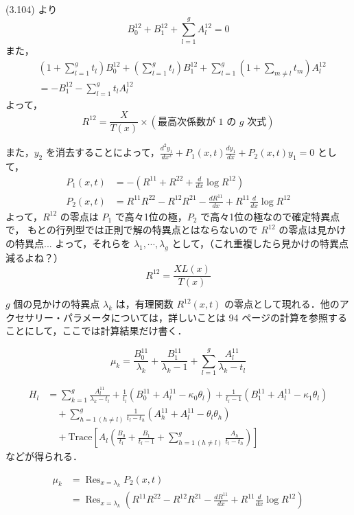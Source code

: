 \documentclass[paper=a4, fontsize=11pt]{jlreq} %
\newenvironment{story}{%
  \begin{mdframed}[
    backgroundcolor=red!5, %
    linewidth=0pt,         %
    innertopmargin=10pt,   %
    innerbottommargin=10pt,
    innerrightmargin=10pt, %
    innerleftmargin=10pt
  ]%
}{%
  \end{mdframed}%
}
\theoremstyle{break}
\theoremstyle{qa}
\begin{document}
(3.104) より
\[
B_0^{12} + B_1^{12} + \sum_{l=1}^g A_l^{12} = 0
\]
また，
\begin{align*}
    &\left( 1 + \sum_{l=1}^g t_l \right) B_0^{12} + \left( \sum_{l=1}^g t_l \right) B_1^{12} + \sum_{l=1}^g \left( 1 + \sum_{m \neq l} t_m \right) A_l^{12} \\
    &= - B_1^{12} - \sum_{l=1}^g t_l A_l^{12}
\end{align*}
よって，
\[
R^{12} = \frac{X}{T(x)} \times (\text{最高次係数が } 1 \text{ の } g \text{ 次式})
\]

また，$y_2$ を消去することによって，$\frac{d^2 y_1}{dx^2} + P_1(x,t) \frac{d y_1}{dx} + P_2(x,t) y_1 = 0$ として，
\begin{align*}
    P_1(x,t) &= - \left( R^{11} + R^{22} + \frac{d}{dx} \log R^{12} \right) \\
    P_2(x,t) &= R^{11} R^{22} - R^{12} R^{21} - \frac{d R^{11}}{dx} + R^{11} \frac{d}{dx} \log R^{12}
\end{align*}
よって，$R^{12}$ の零点は $P_1$ で高々1位の極，$P_2$ で高々1位の極なので確定特異点で，
もとの行列型では正則で解の特異点とはならないので $R^{12}$ の零点は見かけの特異点...
よって，それらを $\lambda_1, \cdots, \lambda_g$ として，（これ重複したら見かけの特異点減るよね？）
\[
R^{12} = \frac{X L(x)}{T(x)}
\]
\begin{story}
$g$ 個の見かけの特異点 $\lambda_k$ は，有理関数 $R^{12}(x,t)$ の零点として現れる．他のアクセサリー・パラメータについては，詳しいことは 94 ページの計算を参照することにして，ここでは計算結果だけ書く．

\[
\mu_k = \frac{B_0^{11}}{\lambda_k} + \frac{B_1^{11}}{\lambda_k - 1} + \sum_{l=1}^g \frac{A_l^{11}}{\lambda_k - t_l}
\]

\[
\begin{aligned}
    H_l &= \sum_{k=1}^g \frac{A_l^{11}}{\lambda_k - t_l} + \frac{1}{t_l} (B_0^{11} + A_l^{11} - \kappa_0 \theta_l) + \frac{1}{t_l - 1} (B_1^{11} + A_l^{11} - \kappa_1 \theta_l) \\
    &\quad + \sum_{h=1 \, (h \neq l)}^g \frac{1}{t_l - t_h} (A_h^{11} + A_l^{11} - \theta_l \theta_h) \\
    &\quad + \mathrm{Trace} \left[ A_l \left( \frac{B_0}{t_l} + \frac{B_1}{t_l - 1} + \sum_{h=1 \, (h \neq l)}^g \frac{A_h}{t_l - t_h} \right) \right]
\end{aligned}
\]
などが得られる．
\end{story}
\begin{align*}
    \mu_k &= \mathop{\mathrm{Res}}_{x=\lambda_k} P_2(x, t) \\
    &= \mathop{\mathrm{Res}}_{x=\lambda_k} \left( R^{11} R^{22} - R^{12} R^{21} - \frac{dR^{11}}{dx} + R^{11} \frac{d}{dx} \log R^{12} \right)
\end{align*}
\end{document}

